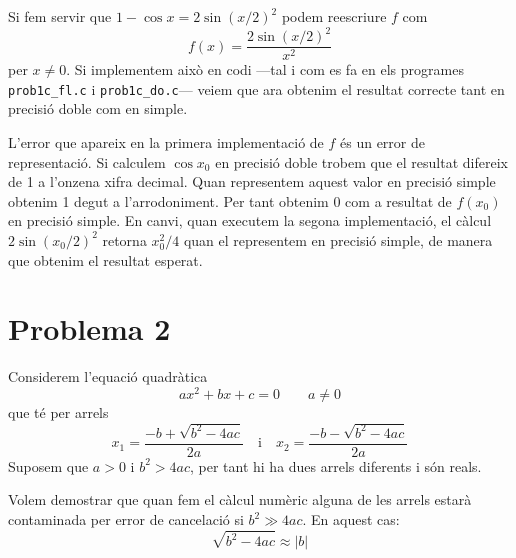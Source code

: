 \documentclass[12pt]{article}
\newcommand{\abs}[1]{\left\lvert#1\right\rvert}
\begin{document}
Si fem servir que \( 1 - \cos{x} = 2 \sin{(x/2)}^2 \) podem reescriure \( f \) com
\begin{equation*}
	f(x) = \dfrac{2\sin{(x/2)^2}}{x^2}
\end{equation*}
per \( x \neq 0 \). Si implementem això en codi ---tal i com es fa en els programes \texttt{prob1c\_fl.c} i \texttt{prob1c\_do.c}--- veiem que ara obtenim el resultat correcte tant en precisió doble com en simple.

L'error que apareix en la primera implementació de \( f \) és un error de representació. Si calculem \( \cos{x_0} \) en precisió doble trobem que el resultat difereix de 1 a l'onzena xifra decimal. Quan representem aquest valor en precisió simple obtenim 1 degut a l'arrodoniment. Per tant obtenim 0 com a resultat de \( f(x_0) \) en precisió simple. En canvi, quan executem la segona implementació, el càlcul \( 2\sin{(x_{0}/2)}^2 \) retorna \( x_{0}^2/4 \) quan el representem en precisió simple, de manera que obtenim el resultat esperat.





\newpage
\section*{Problema 2}
Considerem l'equació quadràtica
\begin{equation*}
	ax^2+bx+c=0\quad\quad a\neq0
\end{equation*}
que té per arrels
\begin{equation*}
	x_1=\frac{-b+ \sqrt{b^2-4ac}}{2a}\quad \text{i}\quad x_2=\frac{-b- \sqrt{b^2-4ac}}{2a}
\end{equation*}
Suposem que $a>0$ i $b^2>4ac$, per tant hi ha dues arrels diferents i són reals.

Volem demostrar que quan fem el càlcul numèric alguna de les arrels estarà contaminada per error de cancelació si $b^2\gg4ac$. En aquest cas:
\begin{equation}\label{eq:b}
	\sqrt{b^2-4ac}\approx \abs{b} 
\end{equation}
\end{document}

